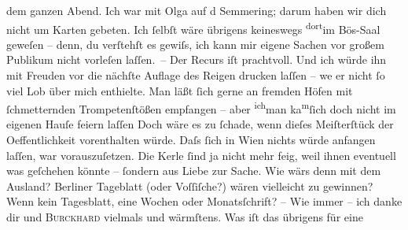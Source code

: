 \begin{ledgroupsized}[t]{13cm}
               dem ganzen Abend. Ich war mit Olga auf d Semmering; darum haben wir dich nicht um Karten
               gebeten. Ich ſelbſt wäre übrigens keineswegs \substVorne{}\textsuperscript{dort}\substDazwischen{}im Bös-Saal\substHinten{} geweſen – denn, du verſtehſt es gewiſs, ich kann mir eigene Sachen vor
               großem Publikum nicht vorleſen laſſen. –\pend
           \pstart
           Der Recurs iſt prachtvoll. Und ich würde ihn mit Freuden vor die nächſte {\pb}Auflage des Reigen drucken laſſen – we{\geminationn} er nicht ſo viel Lob über mich enthielte. Man läßt
               ſich gerne an fremden Höfen mit ſchmetternden Trompetenſtößen empfangen – aber \substVorne{}\textsuperscript{ich}\substDazwischen{}man\substHinten{} ka{\geminationn}\substVorne{}\textsuperscript{m}\substDazwischen{}ſ\substHinten{}ich doch nicht im eigenen Hauſe feiern laſſen{\dotstwo}
               Doch wäre es zu ſchade, wenn dieſes Meiſterſtück der Oeffentlichkeit vorenthalten
               würde. Daſs ſich in Wien nichts würde anfangen
               laſſen, war vorauszuſetzen. Die Kerle ſind ja nicht mehr feig, weil ihnen even{\pb}tuell was geſchehen
               könnte – ſondern aus Liebe zur Sache. Wie wärs denn mit dem Ausland? Berliner Tageblatt (oder Voſſiſche?) wären vielleicht zu gewinnen? Wenn kein Tagesblatt,
               eine Wochen oder Monatsſchrift? – Wie immer – ich danke dir und \textsc{Burckhard} vielmals und wärmſtens. Was iſt das übrigens für eine \label{K_L01338-1v}
\end{ledgroupsized}
